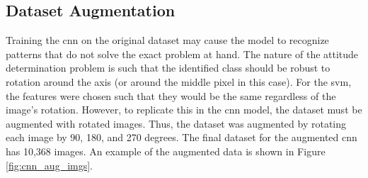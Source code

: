 \documentclass[10pt,twocolumn,letterpaper]{article}
\begin{document}
\subsection{Dataset Augmentation}

Training the \acrshort{cnn} on the original dataset may cause the model to recognize patterns that do not solve the exact problem at hand. The nature of the attitude determination problem is such that the identified class should be robust to rotation around the axis (or around the middle pixel in this case). For the \acrshort{svm}, the features were chosen such that they would be the same regardless of the image's rotation. However, to replicate this in the \acrshort{cnn} model, the dataset must be augmented with rotated images. Thus, the dataset was augmented by rotating each image by 90, 180, and 270 degrees. The final dataset for the augmented \acrshort{cnn} has 10,368 images. An example of the augmented data is shown in Figure \ref{fig:cnn_aug_imgs}.
\end{document}
